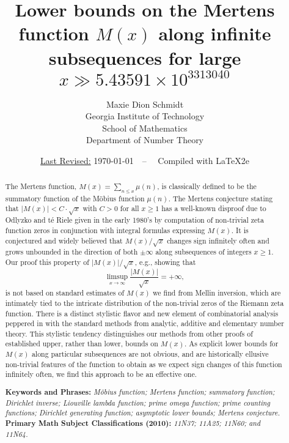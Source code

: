 \documentclass[11pt,reqno,a4letter]{article}
\title{
       \LARGE{
       Lower bounds on the Mertens function $M(x)$ along infinite subsequences for large 
       $x \gg 5.43591 \times 10^{3313040}$ 
       } 
}
\author{{\Large Maxie Dion Schmidt} \\ 
        {\small Georgia Institute of Technology} \\[0.025cm] 
        {\small School of Mathematics} \\[0.025cm] 
        {\small Department of Number Theory} 
}
\date{\small\underline{Last Revised:} \today\ \ -- \ \ Compiled with \LaTeX2e}
\numberwithin{figure}{section}
\numberwithin{table}{section}
\theoremstyle{plain}
\numberwithin{theorem}{section}
\theoremstyle{definition}
\begin{document}
 

\maketitle

\begin{abstract} 
The Mertens function, $M(x) = \sum_{n \leq x} \mu(n)$, is classically 
defined to be the summatory function of the M\"obius function 
$\mu(n)$. The 
Mertens conjecture stating that $|M(x)| < C \cdot \sqrt{x}$ with $C > 0$ for all 
$x \geq 1$ has a well-known disproof due to Odlyzko and t\'{e} Riele given in the early 1980's by computation of 
non-trivial zeta function zeros in conjunction with integral formulas expressing $M(x)$. 
It is conjectured and widely believed that $M(x) / \sqrt{x}$ changes sign infinitely often and grows 
unbounded in the direction of both $\pm \infty$ along subsequences of integers $x \geq 1$. 
Our proof this property of $|M(x)|/\sqrt{x}$, e.g., showing that 
$$\limsup_{x \rightarrow \infty} \frac{|M(x)|}{\sqrt{x}} = +\infty,$$ is not based on 
standard estimates of $M(x)$ we find from Mellin inversion, which are intimately tied to the 
intricate distribution of the non-trivial zeros of the Riemann zeta function. 
There is a distinct stylistic 
flavor and new element of combinatorial analysis 
peppered in with the standard methods from analytic, additive and elementary number theory. 
This stylistic tendency distinguishes 
our methods from other proofs of established upper, rather than lower, bounds on $M(x)$. 
As explicit lower bounds for $M(x)$ along particular subsequences are not obvious, and are 
historically ellusive non-trivial features of the function to obtain as 
we expect sign changes of this function infinitely often, we find this approach to be an effective one. 

\bigskip 
\noindent
\textbf{Keywords and Phrases:} {\it M\"obius function; Mertens function; summatory function; 
                                    Dirichlet inverse; Liouville lambda function; prime omega function; 
                                    prime counting functions; Dirichlet generating function; 
                                    asymptotic lower bounds; Mertens conjecture. } \\ 
\textbf{Primary Math Subject Classifications (2010):} {\it 11N37; 11A25; 11N60; and 11N64. } 
\end{abstract} 
\end{document}
